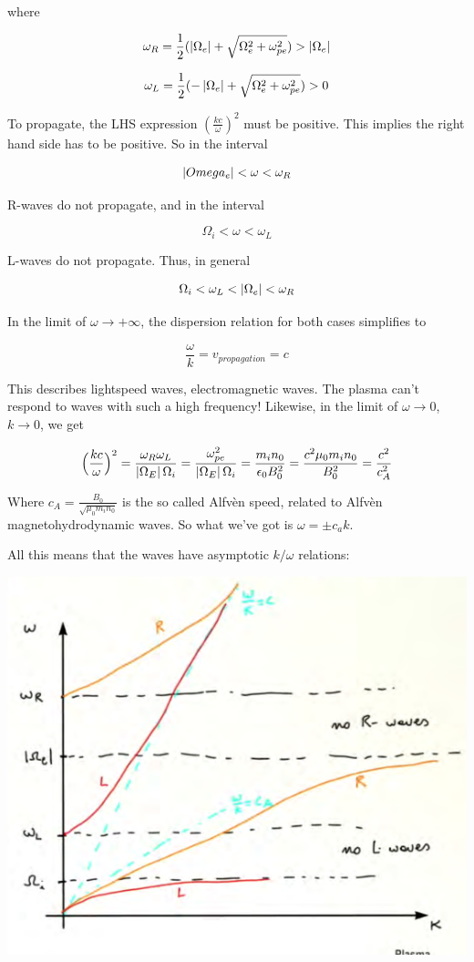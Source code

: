 \documentclass[PlasmaNotes.tex]{subfiles}
\begin{document}
where

\[ \omega_R = \frac{1}{2} (\left| \Omega_e \right|  + \sqrt{\Omega_e^2 + \omega_{pe}^2} ) > \left| \Omega_e \right| \]

\[ \omega_L = \frac{1}{2} (-\left| \Omega_e \right|  + \sqrt{\Omega_e^2 + \omega_{pe}^2} ) > 0 \]

To propagate, the LHS expression $(\frac{k c}{\omega})^2$ must be positive. This implies the right hand side has to be positive. So in the interval

\[ \left| Omega_e \right| < \omega < \omega_R \]

R-waves do not propagate, and in the interval

\[ \Omega_i < \omega < \omega_L \]

L-waves do not propagate. Thus, in general

\[ \Omega_i < \omega_L < \left| \Omega_e \right| < \omega_R \]

In the limit of $\omega \rightarrow +\infty$, the dispersion relation for both cases simplifies to

\[ \frac{\omega}{k} = v_{propagation} = c \]

This describes lightspeed waves, electromagnetic waves. The plasma can't respond to waves with such a high frequency! Likewise, in the limit of $\omega \rightarrow 0$, $k\rightarrow 0$, we get

\[ \Big(\frac{k c}{\omega}\Big)^2 = \frac{\omega_R \omega_L}{\left| \Omega_E \right| \Omega_i} = \frac{\omega_{pe}^2}{\left| \Omega_E \right| \Omega_i} = \frac{m_i n_0}{\epsilon_0 B_0^2} = \frac{c^2 \mu_0 m_i n_0}{B_0^2} = \frac{c^2}{c_A^2} \]

Where $c_A = \frac{B_0}{\sqrt{\mu_0 m_i n_0}}$ is the so called Alfvèn speed, related to Alfvèn magnetohydrodynamic waves. So what we've got is $\omega = \pm c_a k$.

All this means that the waves have asymptotic $k/\omega$ relations:

\includegraphics[width=\linewidth]{leftrightfrequencies}
\end{document}
